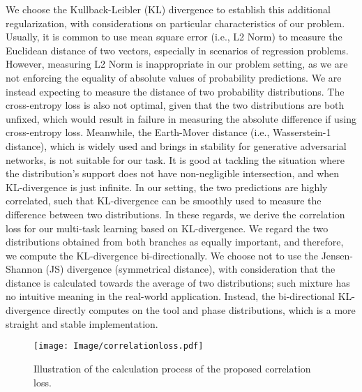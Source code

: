 \documentclass{elsarticle}
\begin{document}
We choose the Kullback-Leibler (KL) divergence to establish this additional regularization, with considerations on particular characteristics of our problem.
Usually, it is common to use mean square error (i.e., L2 Norm) to measure the Euclidean distance of two vectors, especially in scenarios of regression problems. However, measuring L2 Norm is inappropriate in our problem setting, as we are not enforcing the equality of absolute values of probability predictions.
We are instead expecting to measure the distance of two probability distributions.
The cross-entropy loss is also not optimal, given that the two distributions are both unfixed, which would result in failure in measuring the absolute difference if using cross-entropy loss.
Meanwhile, the Earth-Mover distance (i.e., Wasserstein-1 distance), which is widely used and brings in stability for generative adversarial networks, is not suitable for our task. 
It is good at tackling the situation where the distribution's support does not have non-negligible intersection, and when KL-divergence is just infinite.
In our setting, the two predictions are highly correlated, such that KL-divergence can be smoothly used to measure the difference between two distributions.
In these regards, we derive the correlation loss for our multi-task learning based on KL-divergence.
We regard the two distributions obtained from both branches as equally important, and therefore, we compute the KL-divergence bi-directionally.
We choose not to use the Jensen-Shannon (JS) divergence (symmetrical distance), with consideration that the distance is calculated towards the average of two distributions; such mixture has no intuitive meaning in the real-world application.
Instead, the bi-directional KL-divergence directly computes on the tool and phase distributions, which is a more straight and stable implementation.



\begin{figure*}[t]
	\centering
	\texttt{[image: Image/correlationloss.pdf]}
	\caption{Illustration of the calculation process of the proposed correlation loss.}
	\label{fig:correlationloss}
\end{figure*}
\end{document}
